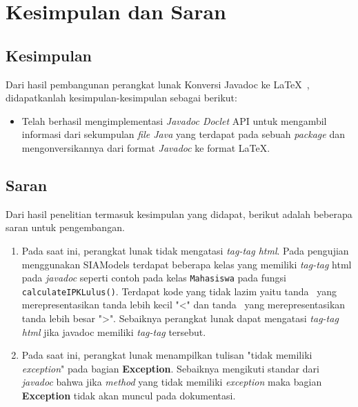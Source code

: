\chapter{Kesimpulan dan Saran}
\label{sec:kesimpulan dan saran}

\section{Kesimpulan}
\label{sec:kesimpulan}
Dari hasil pembangunan perangkat lunak Konversi Javadoc ke \LaTeX\ , didapatkanlah kesimpulan-kesimpulan sebagai berikut:
\begin{itemize}
	\item Telah berhasil mengimplementasi {\it Javadoc Doclet} API untuk mengambil informasi dari sekumpulan {\it file Java} yang terdapat pada sebuah {\it package} dan mengonversikannya dari format {\it Javadoc} ke format \LaTeX.
\end{itemize}

\section{Saran}
\label{sec:saran}
Dari hasil penelitian termasuk kesimpulan yang didapat, berikut adalah beberapa saran untuk pengembangan.
\begin{enumerate}
	\item Pada saat ini, perangkat lunak tidak mengatasi {\it tag-tag html}. Pada pengujian menggunakan SIAModels terdapat beberapa kelas yang memiliki {\it tag-tag} html pada {\it javadoc} seperti contoh pada kelas {\tt Mahasiswa} pada fungsi {\tt calculateIPKLulus()}. Terdapat kode yang tidak lazim yaitu tanda \textexclamdown\ yang merepresentasikan tanda lebih kecil "<" dan tanda \textquestiondown\ yang merepresentasikan tanda lebih besar ">". Sebaiknya perangkat lunak dapat mengatasi {\it tag-tag html} jika javadoc memiliki {\it tag-tag} tersebut.
	\item Pada saat ini, perangkat lunak menampilkan tulisan "tidak memiliki {\it exception}" pada bagian {\bf Exception}. Sebaiknya mengikuti standar dari {\it javadoc} bahwa jika {\it method} yang tidak memiliki {\it exception} maka bagian {\bf Exception} tidak akan muncul pada dokumentasi.
\end{enumerate}
